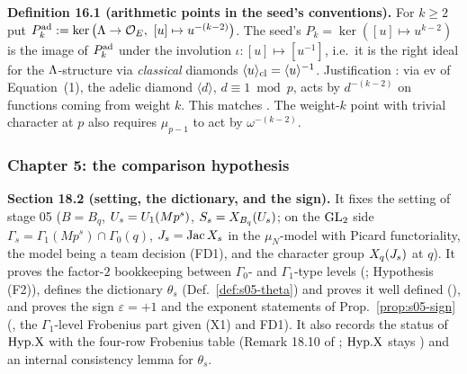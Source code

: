 \medskip
\noindent{}\label{rpt:def:s04-Pk}\textbf{Definition 16.1 (arithmetic points in the seed's conventions).}
For $k\ge2$ put $P^{\rm ad}_k:=\ker\big(\Lam\to\cOE,\ [u]\mapsto u^{-(k-2)}\big)$. The seed's $P_k=\ker([u]\mapsto u^{k-2})$ is the
image of $P^{\rm ad}_k$ under the involution $\iota:[u]\mapsto[u^{-1}]$, i.e.\ it is the right ideal for the $\Lambda$-structure via
\emph{classical} diamonds $\langle u\rangle_{\rm cl}=\langle u\rangle^{-1}$.
Justification \stproved{}: via $\mathrm{ev}$ of Equation~(1), the adelic diamond $\langle d\rangle$, $d\equiv1\bmod p$, acts by
$d^{-(k-2)}$ on functions coming from weight $k$. This matches \cite[\S4.4, Def.~4.1, p.~31]{Hs}. The weight-$k$ point with trivial
character at $p$ also requires $\mu_{p-1}$ to act by $\omega^{-(k-2)}$.

\subsubsection*{Chapter 5: the comparison hypothesis}

\noindent{}\label{rpt:ss:s05-sign}\textbf{Section 18.2 (setting, the dictionary, and the sign).}
It fixes the setting of stage 05 ($B=B_q$, $U_s=U_1(Mp^s)$, $S_s=X_{B_q}(U_s)$; on the $\mathrm{GL}_2$ side $\Gamma_s=\Gamma_1(Mp^s)\cap\Gamma_0(q)$,
$J_s=\operatorname{Jac} X_s$ in the $\mu_N$-model with Picard functoriality, the model being a team decision (FD1), and the character group
$X_q(J_s)$ at $q$). It proves the factor-$2$ bookkeeping between $\Gamma_0$- and $\Gamma_1$-type levels (\stproved; Hypothesis (F2)),
defines the dictionary $\theta_s$ (Def.~\ref{def:s05-theta}) and proves it well defined (\stproved), and proves the sign
$\varepsilon=+1$ and the exponent statements of Prop.~\ref{prop:s05-sign} (\stpmc{}, the $\Gamma_1$-level Frobenius part given (X1) and
FD1). It also records the status of $\mathrm{Hyp.X}$ with the four-row Frobenius table (Remark 18.10 of \mainpdf; $\mathrm{Hyp.X}$ stays \sthyp) and an
internal consistency lemma for $\theta_s$.

